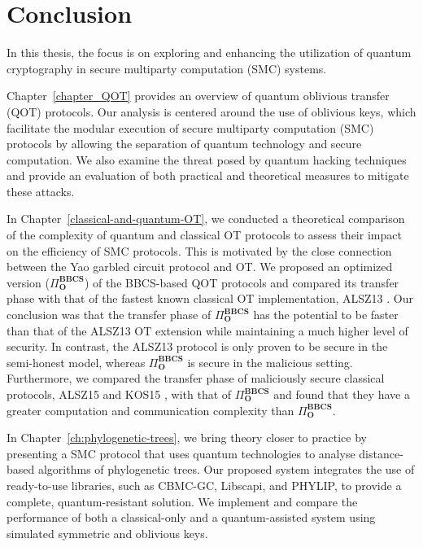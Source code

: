 


%

\chapter{Conclusion}
\label{ch:conclusion}

In this thesis, the focus is on exploring and enhancing the utilization of quantum cryptography in secure multiparty computation (SMC) systems. 

Chapter~\ref{chapter_QOT} provides an overview of quantum oblivious transfer (QOT) protocols. Our analysis is centered around the use of oblivious keys, which facilitate the modular execution of secure multiparty computation (SMC) protocols by allowing the separation of quantum technology and secure computation. We also examine the threat posed by quantum hacking techniques and provide an evaluation of both practical and theoretical measures to mitigate these attacks.

In Chapter~\ref{classical-and-quantum-OT}, we conducted a theoretical comparison of the complexity of quantum and classical OT protocols to assess their impact on the efficiency of SMC protocols. This is motivated by the close connection between the Yao garbled circuit protocol and OT. We proposed an optimized version ($\Pi^{\textbf{BBCS}}_{\textbf{O}}$) of the BBCS-based QOT protocols and compared its transfer phase with that of the fastest known classical OT implementation, ALSZ13 \cite{ALSZ13}. Our conclusion was that the transfer phase of $\Pi^{\textbf{BBCS}}_{\textbf{O}}$ has the potential to be faster than that of the ALSZ13 OT extension while maintaining a much higher level of security. In contrast, the ALSZ13 protocol is only proven to be secure in the semi-honest model, whereas $\Pi^{\textbf{BBCS}}_{\textbf{O}}$ is secure in the malicious setting.
Furthermore, we compared the transfer phase of maliciously secure classical protocols, ALSZ15 \cite{ALSZ15} and KOS15 \cite{KOS15}, with that of $\Pi^{\textbf{BBCS}}_{\textbf{O}}$ and found that they have a greater computation and communication complexity than $\Pi^{\textbf{BBCS}}_{\textbf{O}}$.

In Chapter~\ref{ch:phylogenetic-trees}, we bring theory closer to practice by presenting a SMC protocol that uses quantum technologies to analyse distance-based algorithms of phylogenetic trees. Our proposed system integrates the use of ready-to-use libraries, such as CBMC-GC, Libscapi, and PHYLIP, to provide a complete, quantum-resistant solution. We implement and compare the performance of both a classical-only and a quantum-assisted system using simulated symmetric and oblivious keys. %

